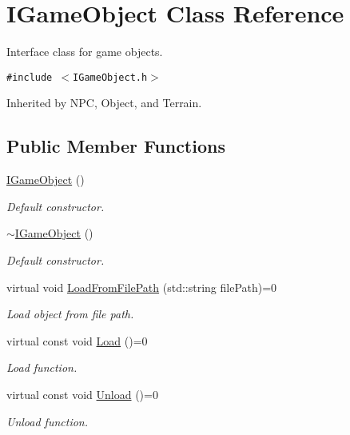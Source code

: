\hypertarget{class_i_game_object}{
\section{IGameObject Class Reference}
\label{class_i_game_object}
}
Interface class for game objects.  


{\tt \#include $<$IGameObject.h$>$}

Inherited by NPC, Object, and Terrain.

\subsection*{Public Member Functions}
\begin{CompactItemize}
\item 
\hyperlink{class_i_game_object_20daa5a14a79200a4b995ef763e4bbb5}{IGameObject} ()
\begin{CompactList}\small\item\em Default constructor. \item\end{CompactList}\item 
\hyperlink{class_i_game_object_4f66e595aac6c39352e89101c8e49ad5}{$\sim$IGameObject} ()
\begin{CompactList}\small\item\em Default constructor. \item\end{CompactList}\item 
virtual void \hyperlink{class_i_game_object_10bf61ea34e19af52b45a117d32da934}{LoadFromFilePath} (std::string filePath)=0
\begin{CompactList}\small\item\em Load object from file path. \item\end{CompactList}\item 
virtual const void \hyperlink{class_i_game_object_f60d2de5851de018cd9d0bc2fcb47427}{Load} ()=0
\begin{CompactList}\small\item\em Load function. \item\end{CompactList}\item 
virtual const void \hyperlink{class_i_game_object_4570fd0ad8d774b5414874fc3a67640e}{Unload} ()=0
\begin{CompactList}\small\item\em Unload function. \item\end{CompactList}\item 

\end{CompactItemize}
